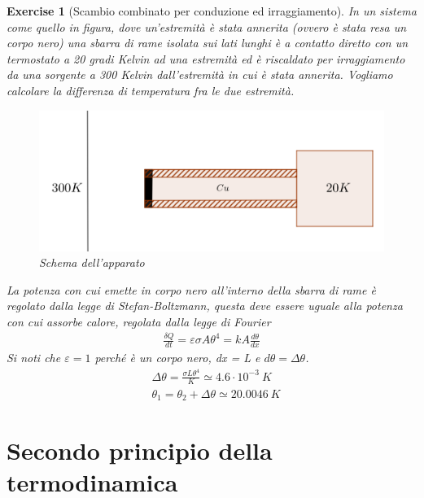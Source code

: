 \documentclass[10pt,a4paper]{article}
\newtheorem{exercise}{Exercise}
\begin{document}
\begin{exercise}[Scambio combinato per conduzione ed irraggiamento]
In un sistema come quello in figura, dove un'estremità è stata annerita (ovvero è stata resa un corpo nero) una sbarra di rame isolata sui lati lunghi è a contatto diretto con un termostato a 20 gradi Kelvin ad una estremità ed è riscaldato per irraggiamento da una sorgente a 300 Kelvin dall'estremità in cui è stata annerita. Vogliamo calcolare la differenza di temperatura fra le due estremità.
\begin{figure}[h!]
	\centering
	\includegraphics[width=0.6\linewidth]{../images/esercizio_scambio_calore}
	\caption{Schema dell'apparato}
	\label{fig:esercizioscambiocalore}
\end{figure}
\FloatBarrier
La potenza con cui emette in corpo nero all'interno della sbarra di rame è regolato dalla legge di Stefan-Boltzmann, questa deve essere uguale alla potenza con cui assorbe calore, regolata dalla legge di Fourier 
\begin{align*}
	\frac{\delta Q}{dt} = \varepsilon \sigma A \theta^4 = k A \frac{d\theta}{dx}
\end{align*}
Si noti che $\varepsilon = 1$ perché è un corpo nero, dx = L e $d\theta = \Delta\theta$.
\begin{align*}
	&\Delta\theta = \frac{\sigma L \theta^4}{K} \simeq 4.6\cdot 10^{-3}\ K\\
	&\theta_1 = \theta_2 + \Delta\theta \simeq 20.0046\ K
\end{align*}

\end{exercise}

\section{Secondo principio della termodinamica}
\end{document}
